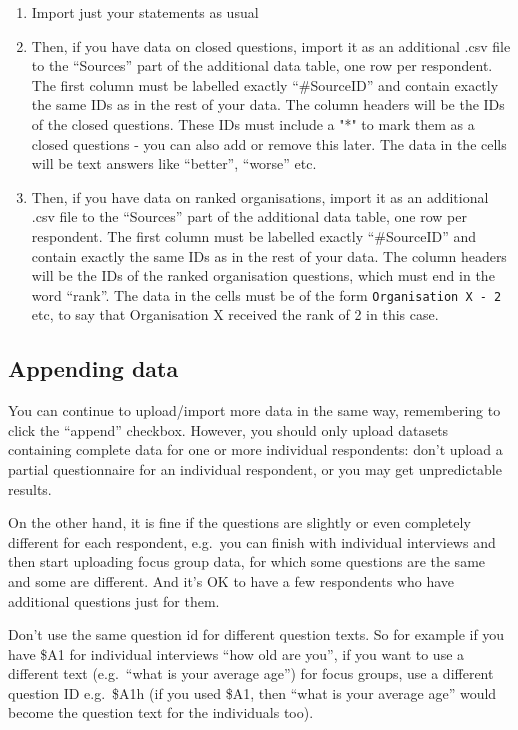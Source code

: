 \documentclass[
]{book}
\providecommand{\tightlist}{%
  \setlength{\itemsep}{0pt}\setlength{\parskip}{0pt}}
\begin{document}
\begin{enumerate}
\def\labelenumi{\arabic{enumi})}
\tightlist
\item
  Import just your statements as usual
\item
  Then, if you have data on closed questions, import it as an additional .csv file to the ``Sources'' part of the additional data table, one row per respondent. The first column must be labelled exactly ``\#SourceID'' and contain exactly the same IDs as in the rest of your data. The column headers will be the IDs of the closed questions. These IDs must include a "*" to mark them as a closed questions - you can also add or remove this later. The data in the cells will be text answers like ``better'', ``worse'' etc.
\item
  Then, if you have data on ranked organisations, import it as an additional .csv file to the ``Sources'' part of the additional data table, one row per respondent. The first column must be labelled exactly ``\#SourceID'' and contain exactly the same IDs as in the rest of your data. The column headers will be the IDs of the ranked organisation questions, which must end in the word ``rank''. The data in the cells must be of the form \texttt{Organisation\ X\ -\ 2} etc, to say that Organisation X received the rank of 2 in this case.
\end{enumerate}

\hypertarget{appending-data}{%
\subsection{Appending data}\label{appending-data}}

You can continue to upload/import more data in the same way, remembering to click the ``append'' checkbox. However, you should only upload datasets containing complete data for one or more individual respondents: don't upload a partial questionnaire for an individual respondent, or you may get unpredictable results.

On the other hand, it is fine if the questions are slightly or even completely different for each respondent, e.g.~you can finish with individual interviews and then start uploading focus group data, for which some questions are the same and some are different. And it's OK to have a few respondents who have additional questions just for them.

Don't use the same question id for different question texts. So for example if you have \$A1 for individual interviews ``how old are you'', if you want to use a different text (e.g.~``what is your average age'') for focus groups, use a different question ID e.g.~\$A1h (if you used \$A1, then ``what is your average age'' would become the question text for the individuals too).
\end{document}

